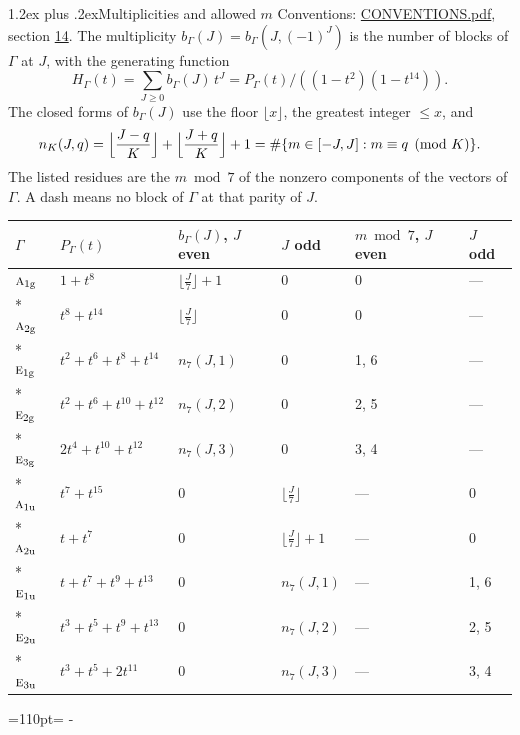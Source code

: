 \documentclass[10pt,a4paper]{article}
\makeatletter
\renewcommand\section{\@startsection{section}{1}{\z@}{-3ex plus -1ex minus -.2ex}%
  {1.2ex plus .2ex}{\normalfont\large\sffamily\bfseries\color{parttitle}}}
\newcommand{\needspace}[1]{\par\penalty-100\begingroup\dimen0=#1\relax\dimen2=\pagegoal
  \advance\dimen2-\pagetotal\ifdim\dimen0>\dimen2\relax\ifdim\dimen2>0pt\vfil\break\fi\fi
  \endgroup}
\numberwithin{equation}{section}
\newcommand{\irr}[1]{\text{\normalfont\scshape #1}}
\newcommand{\ptag}[1]{\mathrm{#1}}
\makeatother
\begin{document}
\section{Multiplicities and allowed \texorpdfstring{$m$}{m}}\label{s:multiplicities}
Conventions: \href{../../CONVENTIONS.pdf}{CONVENTIONS.pdf}, section \href{../../CONVENTIONS.pdf\#conv.14}{14}.
\leavevmode\label{n:function.generating}\label{n:index.generating.variable}\label{n:function.generating.numerator}The multiplicity $b_\Gamma(J) = b_\Gamma(J, (-1)^J)$ is the number of blocks of $\Gamma$ at $J$, with the generating function
\begin{equation}\label{e:gf}H_\Gamma(t) = \sum_{J\ge0} b_\Gamma(J)\,t^J = P_\Gamma(t)/((1-t^{2})(1-t^{14})).\end{equation}
\leavevmode\label{n:delimiter.floor}\label{n:local.floor.x}\label{n:function.count}\label{n:index.modulus.K}\label{n:index.residue}The closed forms of $b_\Gamma(J)$ use the floor $\lfloor x\rfloor$, the greatest integer $\le x$, and
\begin{equation}\label{e:count}n_K(J,q) = \Bigl\lfloor\frac{J-q}{K}\Bigr\rfloor + \Bigl\lfloor\frac{J+q}{K}\Bigr\rfloor + 1 = \#\{m\in[-J,J] : m\equiv q \pmod{K}\}.\end{equation}
\leavevmode\label{n:head.parity}The listed residues are the $m \bmod 7$ of the nonzero components of the vectors of $\Gamma$. A dash means no block of $\Gamma$ at that parity of $J$.
{\small{\renewcommand{\arraystretch}{1.3}\begin{longtable}{@{}llllll@{}}\toprule
$\Gamma$ & $P_\Gamma(t)$ & $b_\Gamma(J)$, $J$ even & $J$ odd & $m \bmod 7$, $J$ even & $J$ odd\\\midrule\endhead
\bottomrule\endfoot\endlastfoot
$\irr{a}_{1\ptag{g}}$ & $1 + t^{8}$ & $\bigl\lfloor\tfrac{J}{7}\bigr\rfloor + 1$ & $0$ & 0 & ---\\*
$\irr{a}_{2\ptag{g}}$ & $t^{8} + t^{14}$ & $\bigl\lfloor\tfrac{J}{7}\bigr\rfloor$ & $0$ & 0 & ---\\*
$\irr{e}_{1\ptag{g}}$ & $t^{2} + t^{6} + t^{8} + t^{14}$ & $n_{7}(J,1)$ & $0$ & 1, 6 & ---\\*
$\irr{e}_{2\ptag{g}}$ & $t^{2} + t^{6} + t^{10} + t^{12}$ & $n_{7}(J,2)$ & $0$ & 2, 5 & ---\\*
$\irr{e}_{3\ptag{g}}$ & $2t^{4} + t^{10} + t^{12}$ & $n_{7}(J,3)$ & $0$ & 3, 4 & ---\\*
$\irr{a}_{1\ptag{u}}$ & $t^{7} + t^{15}$ & $0$ & $\bigl\lfloor\tfrac{J}{7}\bigr\rfloor$ & --- & 0\\*
$\irr{a}_{2\ptag{u}}$ & $t + t^{7}$ & $0$ & $\bigl\lfloor\tfrac{J}{7}\bigr\rfloor + 1$ & --- & 0\\*
$\irr{e}_{1\ptag{u}}$ & $t + t^{7} + t^{9} + t^{13}$ & $0$ & $n_{7}(J,1)$ & --- & 1, 6\\*
$\irr{e}_{2\ptag{u}}$ & $t^{3} + t^{5} + t^{9} + t^{13}$ & $0$ & $n_{7}(J,2)$ & --- & 2, 5\\*
$\irr{e}_{3\ptag{u}}$ & $t^{3} + t^{5} + 2t^{11}$ & $0$ & $n_{7}(J,3)$ & --- & 3, 4\\
\bottomrule\end{longtable}}}
\needspace{110pt}
\end{document}
